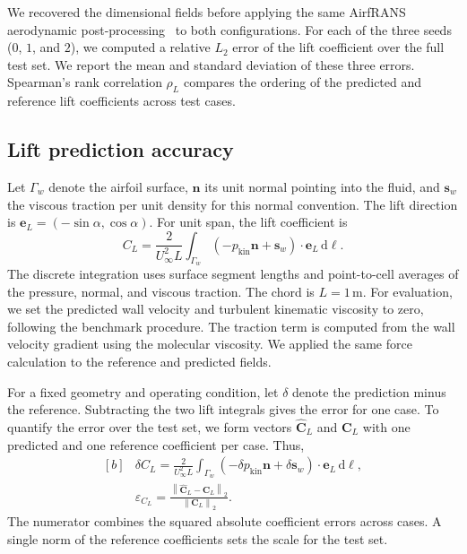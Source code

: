 \documentclass[a4paper,fleqn]{cas-sc}
\begin{document}
We recovered the dimensional fields before applying the same AirfRANS aerodynamic
post-processing~\citep{Bonnet2022AirfRANS} to both configurations. For each of the three seeds ($0$, $1$, and
$2$), we computed a relative $L_2$ error of the lift coefficient over the full test set.
We report the mean and standard deviation of these three errors.
Spearman's rank correlation $\rho_L$ compares the ordering of the predicted and
reference lift coefficients across test cases.

\subsection{Lift prediction accuracy}\label{subsec:airfrans-errors}
\par

Let $\Gamma_w$ denote the airfoil surface, $\mathbf{n}$ its unit normal pointing into
the fluid, and $\mathbf{s}_w$ the viscous traction per unit density for this normal
convention. The lift direction is $\mathbf{e}_L=(-\sin\alpha,\cos\alpha)$.
For unit span, the lift coefficient is
\begin{equation}
  \label{eq:airfrans-lift}
  C_L=\frac{2}{U_\infty^2 L}
      \int_{\Gamma_w}
      \left(-p_{\mathrm{kin}}\mathbf{n}+\mathbf{s}_w\right)
      \cdot\mathbf{e}_L\,\mathrm{d}\ell .
\end{equation}
The discrete integration uses surface segment lengths and point-to-cell averages
of the pressure, normal, and viscous traction. The chord is $L=1\,\mathrm{m}$.
For evaluation, we set the predicted wall velocity and turbulent kinematic viscosity
to zero, following the benchmark procedure. The traction term is computed from
the wall velocity gradient using the molecular viscosity. We applied the same
force calculation to the reference and predicted fields.

For a fixed geometry and operating condition, let $\delta$ denote the prediction
minus the reference. Subtracting the two lift integrals gives the error for one case.
To quantify the error over the test set, we form vectors $\widehat{\mathbf{C}}_L$
and $\mathbf{C}_L$ with one predicted and one reference coefficient per case. Thus,
\begin{equation}
  \label{eq:airfrans-lift-error}
  \begin{aligned}[b]
    &\delta C_L=\frac{2}{U_\infty^2 L}
      \int_{\Gamma_w}
        \left(-\delta p_{\mathrm{kin}}\mathbf{n}+\delta\mathbf{s}_w\right)
        \cdot\mathbf{e}_L\,\mathrm{d}\ell, \\
    &\varepsilon_{C_L}
      =\frac{\left\|\widehat{\mathbf{C}}_L-\mathbf{C}_L\right\|_2}
             {\left\|\mathbf{C}_L\right\|_2}.
  \end{aligned}
\end{equation}
The numerator combines the squared absolute coefficient errors across cases.
A single norm of the reference coefficients sets the scale for the test set.
\end{document}
